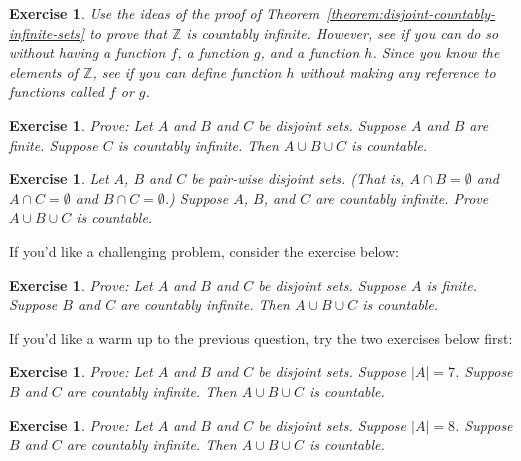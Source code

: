 \documentclass{book}
\newcounter{ekcounter}%
\theoremstyle{ekimcustom}
\newtheorem{exercise}[ekcounter]{Exercise}
\begin{document}
\begin{exercise}\label{exercise:Z-countable}
Use the ideas of the proof of Theorem~\ref{theorem:disjoint-countably-infinite-sets} to prove that $\mathbb{Z}$ is countably infinite. However, see if you can do so without having a function $f$, a function $g$, and a function $h$. Since you know the elements of $\mathbb{Z}$, see if you can define function $h$ without making any reference to functions called $f$ or $g$.
\end{exercise}

\begin{exercise}
Prove: Let $A$ and $B$ and $C$ be disjoint sets. Suppose $A$ and $B$ are finite. Suppose $C$ is countably infinite. Then $A \cup B \cup C$ is countable.
\end{exercise}

\begin{exercise}
Let $A$, $B$ and $C$ be pair-wise disjoint sets. (That is, $A \cap B = \emptyset$ and $A \cap C=\emptyset$ and $B \cap C=\emptyset$.) Suppose $A$, $B$, and $C$ are countably infinite. Prove $A \cup B \cup C$ is countable.
\end{exercise}

If you'd like a challenging problem, consider the exercise below:
\begin{exercise}
Prove: Let $A$ and $B$ and $C$ be disjoint sets. Suppose $A$ is finite. Suppose $B$ and $C$ are countably infinite. Then $A \cup B \cup C$ is countable.
\end{exercise}
If you'd like a warm up to the previous question, try the two exercises below first:
\begin{exercise}
Prove: Let $A$ and $B$ and $C$ be disjoint sets. Suppose $|A|=7$. Suppose $B$ and $C$ are countably infinite. Then $A \cup B \cup C$ is countable.
\end{exercise}
\begin{exercise}
Prove: Let $A$ and $B$ and $C$ be disjoint sets. Suppose $|A|=8$. Suppose $B$ and $C$ are countably infinite. Then $A \cup B \cup C$ is countable.
\end{exercise}
\end{document}
